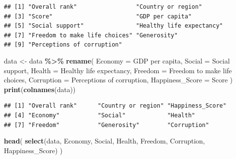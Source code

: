 \documentclass[
  11pt,
]{article}
\newenvironment{Shaded}{\begin{snugshade}}{\end{snugshade}}
\newcommand{\AttributeTok}[1]{\textcolor[rgb]{0.13,0.29,0.53}{#1}}
\newcommand{\FunctionTok}[1]{\textcolor[rgb]{0.13,0.29,0.53}{\textbf{#1}}}
\newcommand{\NormalTok}[1]{#1}
\newcommand{\OtherTok}[1]{\textcolor[rgb]{0.56,0.35,0.01}{#1}}
\newcommand{\SpecialCharTok}[1]{\textcolor[rgb]{0.81,0.36,0.00}{\textbf{#1}}}
\newcommand{\StringTok}[1]{\textcolor[rgb]{0.31,0.60,0.02}{#1}}
\begin{document}
\begin{verbatim}
## [1] "Overall rank"                 "Country or region"           
## [3] "Score"                        "GDP per capita"              
## [5] "Social support"               "Healthy life expectancy"     
## [7] "Freedom to make life choices" "Generosity"                  
## [9] "Perceptions of corruption"
\end{verbatim}

\begin{Shaded}
\begin{Highlighting}[]
\NormalTok{data }\OtherTok{\textless{}{-}}\NormalTok{ data }\SpecialCharTok{\%\textgreater{}\%}
  \FunctionTok{rename}\NormalTok{(}
    \AttributeTok{Economy =} \StringTok{\textasciigrave{}}\AttributeTok{GDP per capita}\StringTok{\textasciigrave{}}\NormalTok{,  }
    \AttributeTok{Social =} \StringTok{\textquotesingle{}Social support\textquotesingle{}}\NormalTok{,                      }
    \AttributeTok{Health =} \StringTok{\textasciigrave{}}\AttributeTok{Healthy life expectancy}\StringTok{\textasciigrave{}}\NormalTok{,}
    \AttributeTok{Freedom =} \StringTok{\textasciigrave{}}\AttributeTok{Freedom to make life choices}\StringTok{\textasciigrave{}}\NormalTok{,  }
    \AttributeTok{Corruption =} \StringTok{\textquotesingle{}Perceptions of corruption\textquotesingle{}}\NormalTok{, }
    \AttributeTok{Happiness\_Score =} \StringTok{\textasciigrave{}}\AttributeTok{Score}\StringTok{\textasciigrave{}}
\NormalTok{  )}
\FunctionTok{print}\NormalTok{(}\FunctionTok{colnames}\NormalTok{(data))}
\end{Highlighting}
\end{Shaded}

\begin{verbatim}
## [1] "Overall rank"      "Country or region" "Happiness_Score"  
## [4] "Economy"           "Social"            "Health"           
## [7] "Freedom"           "Generosity"        "Corruption"
\end{verbatim}

\begin{Shaded}
\begin{Highlighting}[]
  \FunctionTok{head}\NormalTok{(}
    \FunctionTok{select}\NormalTok{(data, Economy, Social, Health, Freedom, Corruption, Happiness\_Score)}
\NormalTok{  )}
\end{Highlighting}
\end{Shaded}
\end{document}
